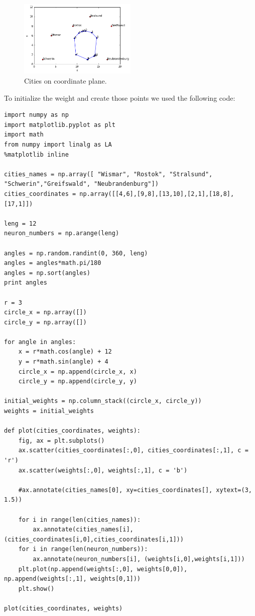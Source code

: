 \documentclass[a4paper, 12pt]{article}
\begin{document}
\begin{figure}[h]
  \centering
  \caption{Cities on coordinate plane.\label{citiesCoord}}
  \includegraphics[width=0.5\textwidth]{cities_plotted}
\end{figure}

To initialize the weight and create those points we used the following code:

\lstset{language=Python}
\begin{lstlisting}[frame=single]
import numpy as np
import matplotlib.pyplot as plt
import math
from numpy import linalg as LA
%matplotlib inline

cities_names = np.array([ "Wismar", "Rostok", "Stralsund", "Schwerin","Greifswald", "Neubrandenburg"])
cities_coordinates = np.array([[4,6],[9,8],[13,10],[2,1],[18,8],[17,1]])

leng = 12
neuron_numbers = np.arange(leng)

angles = np.random.randint(0, 360, leng)
angles = angles*math.pi/180
angles = np.sort(angles)
print angles

r = 3
circle_x = np.array([])
circle_y = np.array([])

for angle in angles:
    x = r*math.cos(angle) + 12
    y = r*math.sin(angle) + 4
    circle_x = np.append(circle_x, x)
    circle_y = np.append(circle_y, y)

initial_weights = np.column_stack((circle_x, circle_y))
weights = initial_weights

def plot(cities_coordinates, weights):
    fig, ax = plt.subplots()
    ax.scatter(cities_coordinates[:,0], cities_coordinates[:,1], c = 'r')
    ax.scatter(weights[:,0], weights[:,1], c = 'b')

    #ax.annotate(cities_names[0], xy=cities_coordinates[], xytext=(3, 1.5))

    for i in range(len(cities_names)):
        ax.annotate(cities_names[i], (cities_coordinates[i,0],cities_coordinates[i,1]))
    for i in range(len(neuron_numbers)):
        ax.annotate(neuron_numbers[i], (weights[i,0],weights[i,1]))
    plt.plot(np.append(weights[:,0], weights[0,0]), np.append(weights[:,1], weights[0,1]))
    plt.show()
    
plot(cities_coordinates, weights)
\end{lstlisting}
\end{document}
